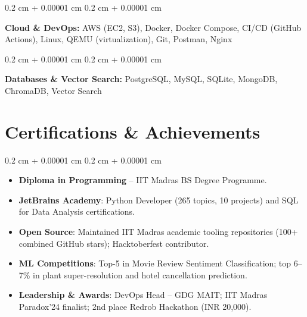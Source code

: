 \documentclass[10pt, letterpaper]{article}
\newenvironment{highlightsforbulletentries}{
    \small
    \begin{itemize}[
        topsep=0.02 cm,
        parsep=0.015 cm,
        partopsep=0pt,
        itemsep=0.015 cm,
        leftmargin=10pt
    ]
}{
    \end{itemize}
} %
\newenvironment{onecolentry}{
    \begin{adjustwidth}{
        0.2 cm + 0.00001 cm
    }{
        0.2 cm + 0.00001 cm
    }
}{
    \end{adjustwidth}
} %
\begin{document}
        \vspace{0.02 cm}

        \begin{onecolentry}
            \textbf{Cloud \& DevOps:} AWS (EC2, S3), Docker, Docker Compose, CI/CD (GitHub Actions), Linux, QEMU (virtualization), Git, Postman, Nginx
        \end{onecolentry}

        \vspace{0.02 cm}

        \begin{onecolentry}
            \textbf{Databases \& Vector Search:} PostgreSQL, MySQL, SQLite, MongoDB, ChromaDB, Vector Search
        \end{onecolentry}


    \section{Certifications \& Achievements}

        \begin{onecolentry}
            \begin{highlightsforbulletentries}
                \item \textbf{Diploma in Programming} -- IIT Madras BS Degree Programme.
                \item \textbf{JetBrains Academy}: Python Developer (265 topics, 10 projects) and SQL for Data Analysis certifications.
                \item \textbf{Open Source}: Maintained IIT Madras academic tooling repositories (100+ combined GitHub stars); Hacktoberfest contributor.
                \item \textbf{ML Competitions}: Top-5 in Movie Review Sentiment Classification; top 6--7\% in plant super-resolution and hotel cancellation prediction.
                \item \textbf{Leadership \& Awards}: DevOps Head -- GDG MAIT; IIT Madras Paradox'24 finalist; 2nd place Redrob Hackathon (INR 20,000).
            \end{highlightsforbulletentries}
        \end{onecolentry}
\end{document}
